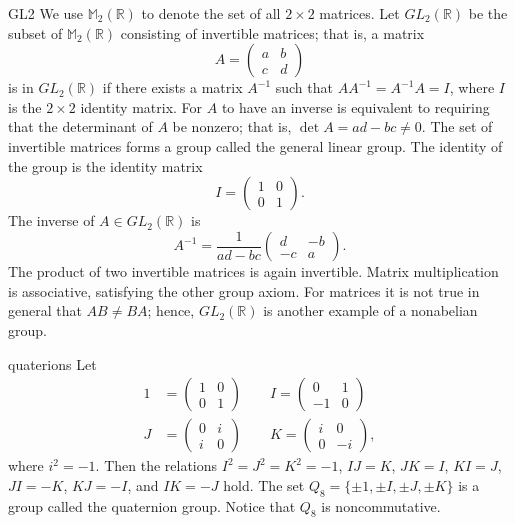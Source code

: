 \begin{example}{GL2}
We use  ${\mathbb M}_2 ( {\mathbb R})$\label{notematrices} to denote the set of all $2 \times 2$ matrices.  Let $GL_2({\mathbb R})$ be the subset of ${\mathbb M}_2 ( {\mathbb R})$ consisting of invertible matrices; that is, a matrix 
\[
A =
\begin{pmatrix}
a & b \\
c & d
\end{pmatrix}
\]
is in  $GL_2( {\mathbb R})$ if there exists a matrix $A^{-1}$ such that
$A A^{-1} = A^{-1} A = I$, where $I$ is the $2 \times 2$ identity
matrix. For $A$ to have an inverse is equivalent to requiring that the
determinant of $A$ be nonzero; that is, $\det A = ad - bc \neq
0$\label{determinant}. The set of invertible matrices forms a group
called the {\bfi general linear group}\label{generallinear}. The identity of the group is the
identity matrix  
\[
I =
\begin{pmatrix}
1 & 0 \\
0 & 1
\end{pmatrix}.
\]
The inverse of $A \in GL_2( {\mathbb R})$ is
\[
A^{-1} =
\frac{1}{ad-bc}
\begin{pmatrix}
d & -b \\
-c & a
\end{pmatrix}.
\]
The product of two invertible matrices is again invertible. Matrix
multiplication is associative, satisfying the other group axiom. For
matrices it is not true in general that $AB \neq BA$; hence, $GL_2(
{\mathbb R})$ is another example of a nonabelian group.
\end{example}
 
 
\begin{example}{quaterions}
Let
\begin{align*}
1
& = 
\begin{pmatrix}
1 & 0 \\
0 & 1
\end{pmatrix}
\qquad
I
=
\begin{pmatrix}
0 & 1 \\
-1 & 0
\end{pmatrix}
\\
J
& = 
\begin{pmatrix}
0 & i \\
i & 0
\end{pmatrix}
\qquad
K =
\begin{pmatrix}
i & 0 \\
0 & -i
\end{pmatrix},
\end{align*}
where $i^2 = -1$. Then the relations $I^2 = J^2 = K^2 = -1$, $IJ=K$,
$JK=I$, $KI=J$, $JI=-K$, $KJ=-I$, and $IK=-J$ hold. The set
$Q_8\label{notequateriongroup} = \{
\pm 1, \pm I, \pm J, \pm K  \}$ is a group called the {\bfi quaternion
group}. Notice that  $Q_8$
is noncommutative. 
\end{example}
 
